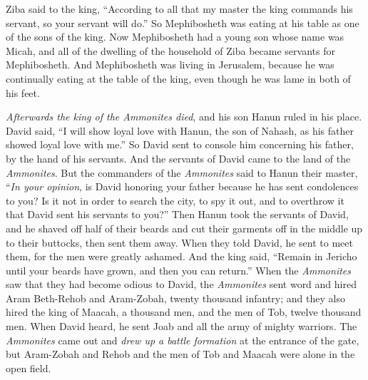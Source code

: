\begin{biblechapter}
\verse Ziba said to the king, “According to all that my master the king commands his servant, so your servant will do.” So Mephibosheth was eating at his table as one of the sons of the king.
\verse Now Mephibosheth had a young son whose name was Micah, and all of the dwelling of the household of Ziba became servants for Mephibosheth.
\verse And Mephibosheth was living in Jerusalem, because he was continually eating at the table of the king, even though he was lame in both of his feet.
\end{biblechapter}

\begin{biblechapter} %
 \textit{Afterwards the king of the Ammonites died}, and his son Hanun ruled in his place.
\verse David said, “I will show loyal love with Hanun, the son of Nahash, as his father showed loyal love with me.” So David sent to console him concerning his father, by the hand of his servants. And the servants of David came to the land of the \textit{Ammonites}.
\verse But the commanders of the \textit{Ammonites} said to Hanun their master, “\textit{In your opinion}, is David honoring your father because he has sent condolences to you? Is it not in order to search the city, to spy it out, and to overthrow it that David sent his servants to you?”
\verse Then Hanun took the servants of David, and he shaved off half of their beards and cut their garments off in the middle up to their buttocks, then sent them away.
\verse When they told David, he sent to meet them, for the men were greatly ashamed. And the king said, “Remain in Jericho until your beards have grown, and then you can return.”
 When the \textit{Ammonites} saw that they had become odious to David, the \textit{Ammonites} sent word and hired Aram Beth-Rehob and Aram-Zobah, twenty thousand infantry; and they also hired the king of Maacah, a thousand men, and the men of Tob, twelve thousand men.
\verse When David heard, he sent Joab and all the army of mighty warriors.
\verse The \textit{Ammonites} came out and \textit{drew up a battle formation} at the entrance of the gate, but Aram-Zobah and Rehob and the men of Tob and Maacah were alone in the open field.

\end{biblechapter}
